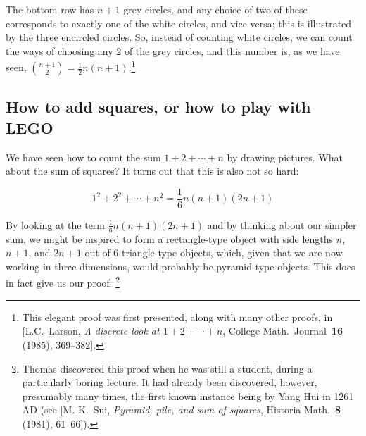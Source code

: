 \begin{center}
\end{center}

The bottom row has $n+1$ grey circles,
and any choice of two of these corresponds to exactly one of the white circles,
and vice versa; this is illustrated by the three encircled circles.
So, instead of counting white circles,
we can count the ways of choosing any 2 of the grey circles, and this number is, as we have seen,
$\binom{n+1}{2} = \frac{1}{2}n(n+1)$.\footnote{This elegant proof was first presented,
along with many other proofs,
in [L.C.~Larson, {\sl A discrete look at $1+2+\cdots+n$},
College Math.\ Journal~{\bf 16} (1985), 369--382].}

\medskip

\subsection*{How to add squares, or how to play with LEGO}
\noindent
We have seen how to count the sum $1 + 2 + \cdots + n$ by drawing pictures.
What about the sum of squares?
It turns out that this is also not so hard:

\begin{theorem}
\label{thm:square_sum}
\[
  1^2 + 2^2 + \cdots + n^2 = \frac{1}{6}n(n+1)(2n+1)
\]
\end{theorem}

By looking at the term $\frac{1}{6}n(n+1)(2n+1)$
and by thinking about our simpler sum,
we might be inspired to form a rectangle-type object with side lengths $n$, $n+1$, and $2n+1$
out of 6 triangle-type objects, which, given that we are now working in three dimensions,
would probably be pyramid-type objects.
This does in fact give us our proof:%
\footnote{Thomas discovered this proof when he was still a student,
  during a particularly boring lecture.
  It had already been discovered, however, presumably many times,
  the first known instance being by Yang Hui in 1261 AD
  (see [M.-K.~Sui, {\sl Pyramid, pile, and sum of squares},
   Historia Math.~{\bf 8} (1981), 61--66]).}

